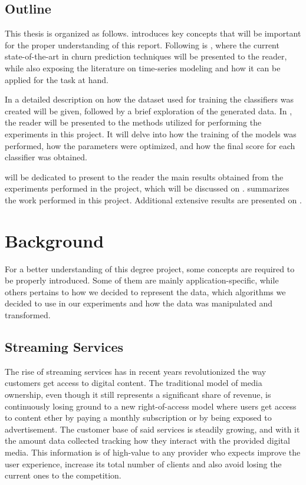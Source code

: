 \documentclass{kththesis}
\begin{document}
\section{Outline}

This thesis is organized as follows.  introduces key concepts that will be important for the proper understanding of this report. Following is , where the current state-of-the-art in churn prediction techniques will be presented to the reader, while also exposing the literature on time-series modeling and how it can be applied for the task at hand. 

In  a detailed description on how the dataset used for training the classifiers was created will be given, followed by a brief exploration of the generated data. In , the reader will be presented to the methods utilized for performing the experiments in this project. It will delve into how the training of the models was performed, how the parameters were optimized, and how the final score for each classifier was obtained.

 will be dedicated to present to the reader the main results obtained from the experiments performed in the project, which will be discussed on .  summarizes the work performed in this project. Additional extensive results are presented on . 

\chapter{Background}
\label{cha:background}

For a better understanding of this degree project, some concepts are required to be properly introduced. Some of them are mainly application-specific, while others pertains to how we decided to represent the data, which algorithms we decided to use in our experiments and how the data was manipulated and transformed. 

	\section{Streaming Services}
	
	The rise of streaming services has in recent years revolutionized the way customers get access to digital content. The traditional model of media ownership, even though it still represents a significant share of revenue, is continuously losing ground to a new right-of-access model where users get access to content ether by paying a monthly subscription or by being exposed to advertisement. The customer base of said services is steadily growing, and with it the amount data collected tracking how they interact with the provided digital media. This information is of high-value to any provider who expects improve the user experience, increase its total number of clients and also avoid losing the current ones to the competition.
\end{document}
